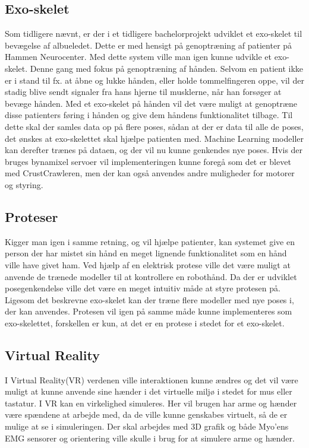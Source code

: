 \subsection{Exo-skelet}
Som tidligere nævnt, er der i et tidligere bachelorprojekt\citep{RefWorks:7} udviklet et exo-skelet til bevægelse af albueledet. Dette er med hensigt på genoptræning af patienter på Hammen Neurocenter. Med dette system ville man igen kunne udvikle et exo-skelet. Denne gang med fokus på genoptræning af hånden. Selvom en patient ikke er i stand til fx. at  åbne og lukke hånden, eller holde tommelfingeren oppe, vil der stadig blive sendt signaler fra hans hjerne til musklerne, når han forsøger at bevæge hånden. Med et exo-skelet på hånden vil det være muligt at genoptræne disse patienters føring i hånden og give dem håndens funktionalitet tilbage. Til dette skal der samles data op på flere poses, sådan at der er data til alle de poses, det ønskes at exo-skelettet skal hjælpe patienten med. Machine Learning modeller kan derefter trænes på dataen, og der vil nu kunne genkendes nye poses. Hvis der bruges bynamixel servoer vil implementeringen kunne foregå som det er blevet med CrustCrawleren, men der kan også anvendes andre muligheder for motorer og styring.

\subsection{Proteser}
Kigger man igen i samme retning, og vil hjælpe patienter, kan systemet give en person der har mistet sin hånd en meget lignende funktionalitet som en hånd ville have givet ham. Ved hjælp af en elektrisk protese ville det være muligt at anvende de trænede modeller til at kontrollere en robothånd. Da der er udviklet posegenkendelse ville det være en meget intuitiv måde at styre protesen på. Ligesom det beskrevne exo-skelet kan der træne flere modeller med nye poses i, der kan anvendes. Protesen vil igen på samme måde kunne implementeres som exo-skelettet, forskellen er kun, at det er en protese i stedet for et exo-skelet.

\subsection{Virtual Reality}
I Virtual Reality(VR) verdenen ville interaktionen kunne ændres og det vil være muligt at kunne anvende sine hænder i det virtuelle miljø i stedet for mus eller tastatur. I VR kan en virkelighed simuleres. Her vil brugen har arme og hænder være spændene at arbejde med, da de ville kunne genskabes virtuelt, så de er mulige at se i simuleringen. Der skal arbejdes med 3D grafik og både Myo'ens EMG sensorer og orientering ville skulle i brug for at simulere arme og hænder.














